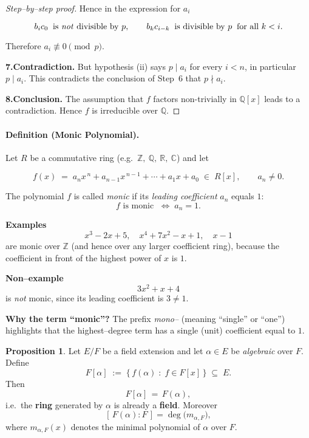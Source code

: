 \documentclass[12pt]{article}
\theoremstyle{definition} %
\newtheorem{proposition}{Proposition}
\theoremstyle{plain} %
\begin{document}
\begin{proof}[Step--by--step proof]
      Hence in the expression for \(a_{i}\)
      
      \[
         b_{i}c_{0}\;\;\text{is \emph{not} divisible by }p,
         \qquad
         b_{k}c_{i-k}\;\;\text{is divisible by }p\;\;\text{for all }k<i.
      \]
      
      Therefore \(a_{i}\not\equiv 0\pmod p\).
      
      \smallskip
      \textbf{7.\;Contradiction.}  
      But hypothesis (ii) says \(p\mid a_{i}\) for every \(i<n\),
      in particular \(p\mid a_{i}\).
      This contradicts the conclusion of Step~6 that \(p\nmid a_{i}\).
      
      \smallskip
      \textbf{8.\;Conclusion.}  
      The assumption that \(f\) factors non-trivially in \(\mathbb{Q}[x]\)
      leads to a contradiction.  
      Hence \(f\) is irreducible over \(\mathbb{Q}\).
      \end{proof}
      \paragraph{Definition (Monic Polynomial).}
Let $R$ be a commutative ring (e.g.\ $\mathbb{Z},\ \mathbb{Q},\ \mathbb{R},\ \mathbb{C}$) and let  

\[
   f(x)\;=\;a_{n}x^{\,n}+a_{n-1}x^{\,n-1}+\cdots+a_{1}x+a_{0}
   \;\in\;R[x], 
   \qquad a_{n}\neq 0 .
\]

The polynomial $f$ is called \emph{monic} if its \emph{leading coefficient} $a_{n}$ equals $1$:
\[
   f \text{ is monic } \;\Longleftrightarrow\; a_{n}=1 .
\]

\medskip
\textbf{Examples}
\[
   x^{3}-2x+5,\quad
   x^{4}+7x^{2}-x+1,\quad
   x-1
\]
are monic over $\mathbb{Z}$ (and hence over any larger coefficient ring), because the coefficient in front of the highest power of $x$ is $1$.

\medskip
\textbf{Non–example}
\[
   3x^{2}+x+4
\]
is \emph{not} monic, since its leading coefficient is $3\neq 1$.

\medskip
\textbf{Why the term “monic”?}  
The prefix \textit{mono–} (meaning “single” or “one”) highlights that the highest–degree term has a single (unit) coefficient equal to $1$.
\begin{proposition}
  Let $E/F$ be a field extension and let $\alpha\in E$ be \emph{algebraic} over $F$.
  Define
  \[
       F[\alpha]\;:=\;\bigl\{\,f(\alpha)\;:\;f\in F[x]\,\bigr\}\;\subseteq\;E.
  \]
  Then
  \[
       F[\alpha]\,=\,F(\alpha),
  \]
  i.e.\ the \textbf{ring} generated by $\alpha$ is already a \textbf{field}.
  Moreover
  \[
       [\,F(\alpha):F\,]=\deg\!\bigl(m_{\alpha,F}\bigr),
  \]
  where $m_{\alpha,F}(x)$ denotes the minimal polynomial of $\alpha$ over $F$.
  \end{proposition}
  
\end{document}
